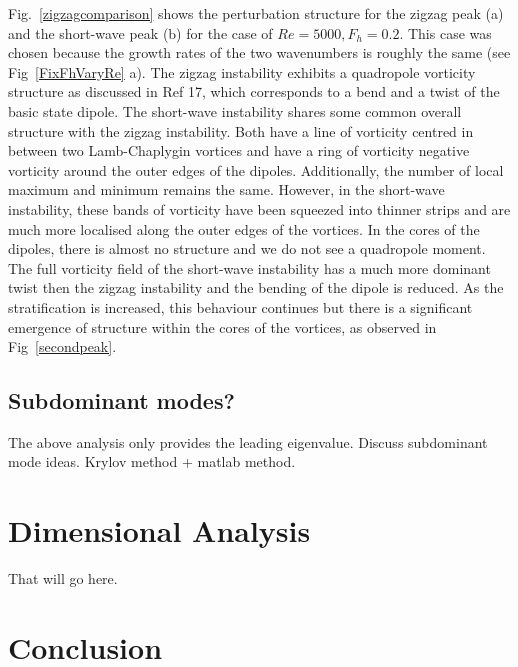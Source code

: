 Fig.~\ref{zigzagcomparison} shows the perturbation structure for the zigzag peak (a) and the short-wave peak (b) for the case of $Re=5000,F_{h}=0.2$. This case was chosen because the growth rates of the two wavenumbers is roughly the same (see Fig~\ref{FixFhVaryRe} a). The zigzag instability exhibits a quadropole vorticity structure as discussed in Ref 17\nocite{bc2000c}, which corresponds to a bend and a twist of the basic state dipole. The short-wave instability shares some common overall structure with the zigzag instability. Both have a line of vorticity centred in between two Lamb-Chaplygin vortices and have a ring of vorticity negative vorticity around the outer edges of the dipoles. Additionally, the number of local maximum and minimum remains the same. However, in the short-wave instability, these bands of vorticity have been squeezed into thinner strips and are much more localised along the outer edges of the vortices. In the cores of the dipoles, there is almost no structure and we do not see a quadropole moment. The full vorticity field of the short-wave instability has a much more dominant twist then the zigzag instability and the bending of the dipole is reduced. As the stratification is increased, this behaviour continues but there is a significant emergence of structure within the cores of the vortices, as observed in Fig~\ref{secondpeak}.


\subsection{Subdominant modes?} 
The above analysis only provides the leading eigenvalue. Discuss subdominant mode ideas. Krylov method + matlab method.
\section{Dimensional Analysis}
That will go here. 


\section{Conclusion}

